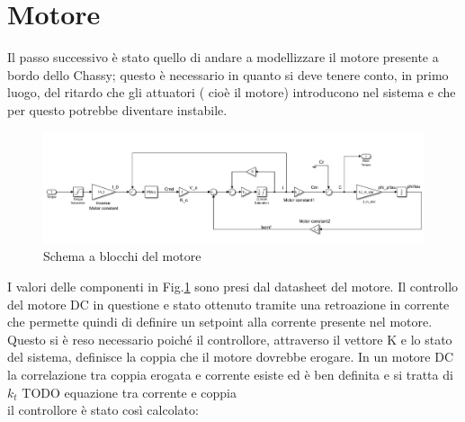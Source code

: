 \section{Motore}
Il passo successivo è stato quello di andare a modellizzare il motore presente a bordo dello Chassy; questo è necessario in quanto si deve tenere conto, in primo luogo, del ritardo che gli attuatori ( cioè il motore) introducono nel sistema e che per questo potrebbe diventare instabile.
\begin{figure}[H]
	\centering   	
	\includegraphics[width=1\textwidth]{Immagini/motor.png}
	\caption{Schema a blocchi del motore}
	\label{fig:motor}
\end{figure}

I valori delle componenti in Fig.\ref{fig:motor} sono presi dal datasheet del motore.
Il controllo del motore DC in questione e stato ottenuto tramite una retroazione in corrente che permette quindi di definire un setpoint alla corrente presente nel motore. Questo si è reso necessario poiché il controllore, attraverso il vettore K e lo stato del sistema, definisce la coppia che il motore dovrebbe erogare. In un motore DC la correlazione tra coppia erogata e corrente esiste ed è ben definita e si tratta di $k_t$ TODO equazione tra corrente e coppia\\
il controllore è stato così calcolato:

